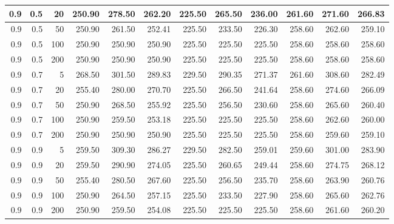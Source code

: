 \begin{longtable}{|r|r|r|r|r|r|r|r|r|r|r|r|}
		\hline
		0.9 & 0.5 & 20 & 250.90 & 278.50 & 262.20 & 225.50 & 265.50 & 236.00 & 261.60 & 271.60 & 266.83\\
		\hline
		0.9 & 0.5 & 50 & 250.90 & 261.50 & 252.41 & 225.50 & 233.50 & 226.30 & 258.60 & 262.60 & 259.10\\
		\hline
		0.9 & 0.5 & 100 & 250.90 & 250.90 & 250.90 & 225.50 & 225.50 & 225.50 & 258.60 & 258.60 & 258.60\\
		\hline
		0.9 & 0.5 & 200 & 250.90 & 250.90 & 250.90 & 225.50 & 225.50 & 225.50 & 258.60 & 258.60 & 258.60\\
		\hline
		0.9 & 0.7 & 5 & 268.50 & 301.50 & 289.83 & 229.50 & 290.35 & 271.37 & 261.60 & 308.60 & 282.49\\
		\hline
		0.9 & 0.7 & 20 & 255.40 & 280.00 & 270.70 & 225.50 & 266.50 & 241.64 & 258.60 & 274.60 & 266.09\\
		\hline
		0.9 & 0.7 & 50 & 250.90 & 268.50 & 255.92 & 225.50 & 256.50 & 230.60 & 258.60 & 265.60 & 260.40\\
		\hline
		0.9 & 0.7 & 100 & 250.90 & 259.50 & 253.18 & 225.50 & 225.50 & 225.50 & 258.60 & 262.60 & 260.00\\
		\hline
		0.9 & 0.7 & 200 & 250.90 & 250.90 & 250.90 & 225.50 & 225.50 & 225.50 & 258.60 & 259.60 & 259.10\\
		\hline
		0.9 & 0.9 & 5 & 259.50 & 309.30 & 286.27 & 229.50 & 282.50 & 259.01 & 259.60 & 301.00 & 283.90\\
		\hline
		0.9 & 0.9 & 20 & 259.50 & 290.90 & 274.05 & 225.50 & 260.65 & 249.44 & 258.60 & 274.75 & 268.12\\
		\hline
		0.9 & 0.9 & 50 & 255.40 & 280.50 & 267.60 & 225.50 & 256.50 & 235.70 & 258.60 & 263.90 & 260.76\\
		\hline
		0.9 & 0.9 & 100 & 250.90 & 264.50 & 257.15 & 225.50 & 233.50 & 227.90 & 258.60 & 265.60 & 262.76\\
		\hline
		0.9 & 0.9 & 200 & 250.90 & 259.50 & 254.08 & 225.50 & 225.50 & 225.50 & 258.60 & 261.60 & 260.20\\
		\hline
	\end{longtable}
	
	
